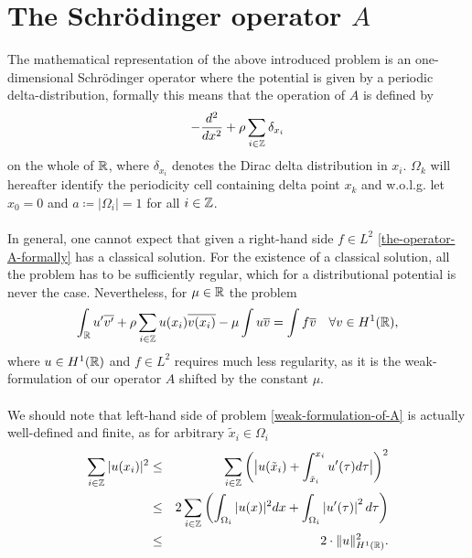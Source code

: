 \chapter{\texorpdfstring{The Schrödinger operator $A$}{The Schrödinger operator A}}

The mathematical representation of the above introduced problem is an one-dimensional Schrödinger operator where the potential is given by a periodic delta-distribution, formally this means that the operation of $A$ is defined by  %
\begin{equation}
	- \frac{d^{2}}{dx^{2}} + \rho \sum_{i \in \mathbb{Z}} \delta_{x_{i}} \label{the-operator-A-formally}
\end{equation}
on the whole of $\mathbb{R}$, where $\delta_{x_{i}}$ denotes the Dirac delta distribution in $x_{i}$. $\Omega_{k}$ will hereafter identify the periodicity cell containing delta point $x_{k}$ and w.o.l.g. let $x_{0} = 0$ and $a \coloneqq |\Omega_{i}| = 1$ for all $i \in \mathbb{Z}$.
~\\ ~\\ %
In general, one cannot expect that given a right-hand side $f \in L^{2}$ \eqref{the-operator-A-formally} has a classical solution. For the existence of a classical solution, all the problem has to be sufficiently regular, which for a distributional potential is never the case. Nevertheless, for $\mu \in \mathbb{R}$ the problem %
\begin{equation}
	\int_{\mathbb{R}} u' \overline{v'} + \rho \sum_{i \in \mathbb{Z}} u(x_{i}) \overline{v(x_{i})} - \mu \int u \overline{v} = \int f \overline{v} \quad \forall v \in H^{1}(\mathbb{R}), \label{weak-formulation-of-A}
\end{equation}	
where $u \in H^{1}(\mathbb{R})$ and $f \in L^{2}$ requires much less regularity, as it is the weak-formulation of our operator $A$ shifted by the constant $\mu$. %
~\\ ~\\
We should note that left-hand side of problem \eqref{weak-formulation-of-A} is actually well-defined and finite, as for arbitrary $\tilde{x}_{i} \in \Omega_{i}$
\begin{eqnarray}
	\sum_{i \in \mathbb{Z}} |u(x_{i})|^{2} & \leq & \sum_{i \in \mathbb{Z}} \left( \big| u(\tilde{x}_{i}) + \int_{\tilde{x}_{i}}^{x_{i}} u'( \tau ) d\tau \big| \right)^{2} \notag \\
		 & \leq & 2 \sum_{i \in \mathbb{Z}} \left( \int_{\Omega_{i}} |u( x )|^{2} dx +  \int_{\Omega_{i}} \left| u'(\tau) \right|^{2} d\tau \right) \notag \\
		 & \leq & 2 \cdot \| u \|^{2}_{H^{1}(\mathbb{R})}. \label{estimation-for-potential}
\end{eqnarray}

